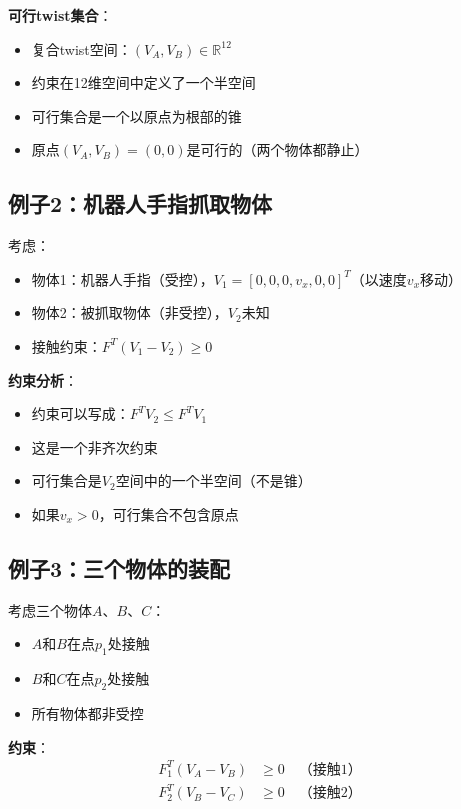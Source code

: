 \documentclass[12pt,a4paper]{article}
\begin{document}
\textbf{可行twist集合}：
\begin{itemize}
\item 复合twist空间：$(V_A, V_B) \in \mathbb{R}^{12}$
\item 约束在12维空间中定义了一个半空间
\item 可行集合是一个以原点为根部的锥
\item 原点$(V_A, V_B) = (0, 0)$是可行的（两个物体都静止）
\end{itemize}

\subsection{例子2：机器人手指抓取物体}

考虑：
\begin{itemize}
\item 物体1：机器人手指（受控），$V_1 = [0, 0, 0, v_x, 0, 0]^T$（以速度$v_x$移动）
\item 物体2：被抓取物体（非受控），$V_2$未知
\item 接触约束：$F^T (V_1 - V_2) \geq 0$
\end{itemize}

\textbf{约束分析}：
\begin{itemize}
\item 约束可以写成：$F^T V_2 \leq F^T V_1$
\item 这是一个非齐次约束
\item 可行集合是$V_2$空间中的一个半空间（不是锥）
\item 如果$v_x > 0$，可行集合不包含原点
\end{itemize}

\subsection{例子3：三个物体的装配}

考虑三个物体$A$、$B$、$C$：
\begin{itemize}
\item $A$和$B$在点$p_1$处接触
\item $B$和$C$在点$p_2$处接触
\item 所有物体都非受控
\end{itemize}

\textbf{约束}：
\begin{align}
F_1^T (V_A - V_B) &\geq 0 \quad \text{（接触1）} \\
F_2^T (V_B - V_C) &\geq 0 \quad \text{（接触2）}
\end{align}
\end{document}
